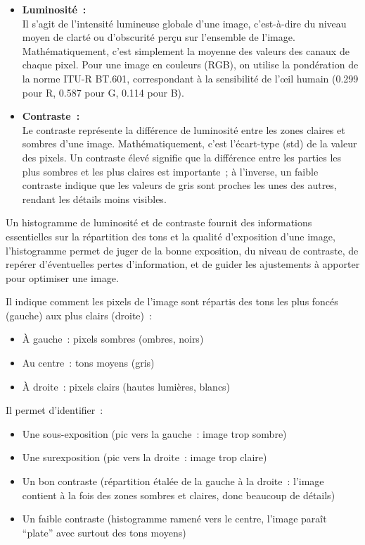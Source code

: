 \begin{quote}
\end{quote}

\begin{itemize}
\tightlist
\item
  \textbf{Luminosité~:}\\
  Il s'agit de l'intensité lumineuse globale d'une image, c'est-à-dire
  du niveau moyen de clarté ou d'obscurité perçu sur l'ensemble de
  l'image. Mathématiquement, c'est simplement la moyenne des valeurs des
  canaux de chaque pixel. Pour une image en couleurs (RGB), on utilise
  la pondération de la norme ITU-R BT.601, correspondant à la
  sensibilité de l'œil humain (0.299 pour R, 0.587 pour G, 0.114 pour
  B).
\item
  \textbf{Contraste~:}\\
  Le contraste représente la différence de luminosité entre les zones
  claires et sombres d'une image. Mathématiquement, c'est l'écart-type
  (std) de la valeur des pixels. Un contraste élevé signifie que la
  différence entre les parties les plus sombres et les plus claires est
  importante~; à l'inverse, un faible contraste indique que les valeurs
  de gris sont proches les unes des autres, rendant les détails moins
  visibles.
\end{itemize}

Un histogramme de luminosité et de contraste fournit des informations
essentielles sur la répartition des tons et la qualité d'exposition
d'une image, l'histogramme permet de juger de la bonne exposition, du
niveau de contraste, de repérer d'éventuelles pertes d'information, et
de guider les ajustements à apporter pour optimiser une image.

Il indique comment les pixels de l'image sont répartis des tons les plus
foncés (gauche) aux plus clairs (droite)~:

\begin{itemize}
\tightlist
\item
  À gauche~: pixels sombres (ombres, noirs)
\item
  Au centre~: tons moyens (gris)
\item
  À droite~: pixels clairs (hautes lumières, blancs)
\end{itemize}

Il permet d'identifier~:

\begin{itemize}
\tightlist
\item
  Une sous-exposition (pic vers la gauche~: image trop sombre)
\item
  Une surexposition (pic vers la droite~: image trop claire)
\item
  Un bon contraste (répartition étalée de la gauche à la droite~:
  l'image contient à la fois des zones sombres et claires, donc beaucoup
  de détails)
\item
  Un faible contraste (histogramme ramené vers le centre, l'image paraît
  ``plate'' avec surtout des tons moyens)
\end{itemize}


